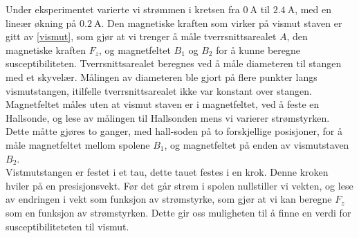 \documentclass[%
 reprint,
 amsmath,amssymb,
 aps,
 norsk,
]{revtex4-1}
\begin{document}
Under eksperimentet varierte vi strømmen i kretsen fra $\SI{0}{\ampere}$ til $\SI{2.4}{\ampere}$, med en lineær økning på $\SI{0.2}{\ampere}$. Den magnetiske kraften som virker på vismut staven er gitt av \eqref{vismut}, som gjør at vi trenger å måle tverrsnittsarealet $A$, den magnetiske kraften $F_z$, og magnetfeltet $B_1$ og $B_2$ for å kunne beregne susceptibiliteten. Tverrsnittsarealet beregnes ved å måle diameteren til stangen med et skyvelær. Målingen av diameteren ble gjort på flere punkter langs vismutstangen, itilfelle tverrsnittsarealet ikke var konstant over stangen. Magnetfeltet måles uten at vismut staven er i magnetfeltet, ved å feste en Hallsonde, og lese av målingen til Hallsonden mens vi varierer strømstyrken. Dette måtte gjøres to ganger, med hall-soden på to forskjellige posisjoner, for å måle magnetfeltet mellom spolene $B_1$, og magnetfeltet på enden av vismutstaven $B_2$. \\
Vistmutstangen er festet i et tau, dette tauet festes i en krok. Denne kroken hviler på en presisjonsvekt. Før det går strøm i spolen nullstiller vi vekten, og lese av endringen i vekt som funksjon av strømstyrke, som gjør at vi kan beregne $F_z$ som en funksjon av strømstyrken. Dette gir oss muligheten til å finne en verdi for susceptibiliteteten til vismut.
\end{document}
